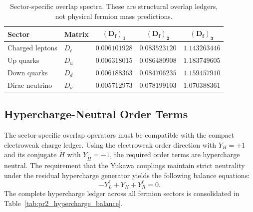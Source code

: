 \documentclass[11pt]{article}
\renewcommand{\arraystretch}{1.22}
\renewcommand{\arraystretch}{1.4}
\begin{document}
 \begin{table}[ht!]
\centering
\caption{Sector-specific overlap spectra. These are structural overlap ledgers, not physical fermion mass predictions.}
\label{tab:pr2_sector_specific_overlap_spectra}
\small
\renewcommand{\arraystretch}{1.25}
\begin{tabular}{llccc}
\hline\hline
\textbf{Sector} & \textbf{Matrix} & \(\boldsymbol{(D_f)_1}\) & \(\boldsymbol{(D_f)_2}\) & \(\boldsymbol{(D_f)_3}\) \\ \hline
Charged leptons & \(D_\ell\) & \(0.006101928\) & \(0.083523120\) & \(1.143263446\) \\
Up quarks       & \(D_u\)    & \(0.006318015\) & \(0.086480908\) & \(1.183749605\) \\
Down quarks     & \(D_d\)    & \(0.006188363\) & \(0.084706235\) & \(1.159457910\) \\
Dirac neutrino  & \(D_\nu\)  & \(0.005712973\) & \(0.078199103\) & \(1.070388361\) \\ \hline\hline
\end{tabular}
\end{table}

\subsection{Hypercharge-Neutral Order Terms}
\label{sec:pr2_hypercharge_neutral_order_terms}

The sector-specific overlap operators must be compatible with the compact electroweak charge ledger. 
Using the electroweak order direction with \(Y_H=+1\) and its conjugate \(\widetilde H\) with \(Y_{\widetilde H}=-1\), the required order terms are hypercharge neutral. The requirement that the Yukawa couplings maintain strict neutrality under the residual hypercharge generator yields the following balance equations:
\begin{equation}
\boxed{
-Y_L^\ell+Y_H+Y_R^\ell = 0.
}
\end{equation}
The complete hypercharge ledger across all fermion sectors is consolidated in Table~\ref{tab:pr2_hypercharge_balance}.
\end{document}
